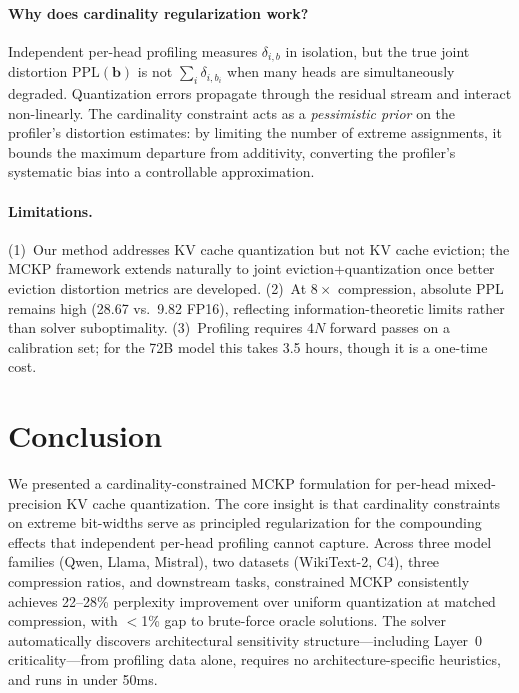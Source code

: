 \documentclass[11pt,a4paper]{article}
\begin{document}
\paragraph{Why does cardinality regularization work?}
Independent per-head profiling measures $\delta_{i,b}$ in isolation, but the true joint distortion $\text{PPL}(\mathbf{b})$ is not $\sum_i \delta_{i,b_i}$ when many heads are simultaneously degraded.
Quantization errors propagate through the residual stream and interact non-linearly.
The cardinality constraint acts as a \emph{pessimistic prior} on the profiler's distortion estimates: by limiting the number of extreme assignments, it bounds the maximum departure from additivity, converting the profiler's systematic bias into a controllable approximation.

\paragraph{Limitations.}
(1)~Our method addresses KV cache quantization but not KV cache eviction; the MCKP framework extends naturally to joint eviction+quantization once better eviction distortion metrics are developed.
(2)~At $8\times$ compression, absolute PPL remains high (28.67 vs.\ 9.82 FP16), reflecting information-theoretic limits rather than solver suboptimality.
(3)~Profiling requires $4N$ forward passes on a calibration set; for the 72B model this takes 3.5 hours, though it is a one-time cost.

\section{Conclusion}

We presented a cardinality-constrained MCKP formulation for per-head mixed-precision KV cache quantization.
The core insight is that cardinality constraints on extreme bit-widths serve as principled regularization for the compounding effects that independent per-head profiling cannot capture.
Across three model families (Qwen, Llama, Mistral), two datasets (WikiText-2, C4), three compression ratios, and downstream tasks, constrained MCKP consistently achieves 22--28\% perplexity improvement over uniform quantization at matched compression, with $<$1\% gap to brute-force oracle solutions.
The solver automatically discovers architectural sensitivity structure---including Layer~0 criticality---from profiling data alone, requires no architecture-specific heuristics, and runs in under 50ms.
\end{document}
